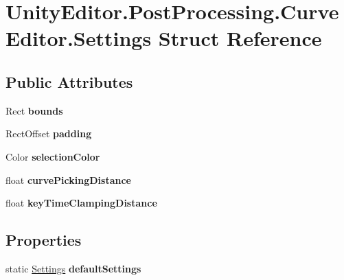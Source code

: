 \hypertarget{struct_unity_editor_1_1_post_processing_1_1_curve_editor_1_1_settings}{}\section{Unity\+Editor.\+Post\+Processing.\+Curve\+Editor.\+Settings Struct Reference}
\label{struct_unity_editor_1_1_post_processing_1_1_curve_editor_1_1_settings}
\subsection*{Public Attributes}
\begin{DoxyCompactItemize}
\item 
\mbox{\label{struct_unity_editor_1_1_post_processing_1_1_curve_editor_1_1_settings_a146ecea52f13c5690007a081577c09d1}} 
Rect {\bfseries bounds}
\item 
\mbox{\label{struct_unity_editor_1_1_post_processing_1_1_curve_editor_1_1_settings_a70cb607e1a1ac18ccbba3bbbfbf4ea69}} 
Rect\+Offset {\bfseries padding}
\item 
\mbox{\label{struct_unity_editor_1_1_post_processing_1_1_curve_editor_1_1_settings_af2ad5ff411e541438041f4ad90f8815a}} 
Color {\bfseries selection\+Color}
\item 
\mbox{\label{struct_unity_editor_1_1_post_processing_1_1_curve_editor_1_1_settings_aacadabfe0ea214d74c5f1742bf7295b0}} 
float {\bfseries curve\+Picking\+Distance}
\item 
\mbox{\label{struct_unity_editor_1_1_post_processing_1_1_curve_editor_1_1_settings_ab4c48700684d8b5dc374b7a03b26f44a}} 
float {\bfseries key\+Time\+Clamping\+Distance}
\end{DoxyCompactItemize}
\subsection*{Properties}
\begin{DoxyCompactItemize}
\item 
\mbox{\label{struct_unity_editor_1_1_post_processing_1_1_curve_editor_1_1_settings_a58c315048e65e1ac57360b771dd55135}} 
static \mbox{\hyperlink{struct_unity_editor_1_1_post_processing_1_1_curve_editor_1_1_settings}{Settings}} {\bfseries default\+Settings}
\end{DoxyCompactItemize}


